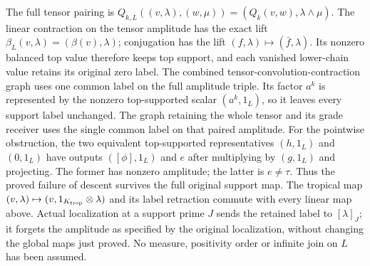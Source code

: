 The full tensor pairing is
$Q_{k,L}((v,\lambda),(w,\mu))
=(Q_k(v,w),\lambda\wedge\mu)$.
The linear contraction on the tensor amplitude
has the exact lift
$\beta_L(v,\lambda)=(\beta(v),\lambda)$;
conjugation has the lift
$(f,\lambda)\mapsto(\bar f,\lambda)$.
Its nonzero balanced top value therefore keeps
top support, and each vanished lower-chain
value retains its original zero label.
The combined tensor-convolution-contraction
graph uses one common label on the full
amplitude triple.
Its factor $a^k$ is represented by the
nonzero top-supported scalar $(a^k,1_L)$,
so it leaves every support label unchanged.
The graph retaining the whole tensor and
its grade receiver uses the single common
label on that paired amplitude.
For the pointwise obstruction, the two
equivalent top-supported representatives
$(h,1_L)$ and $(0,1_L)$ have outputs
$([\phi],1_L)$ and $e$ after multiplying
by $(g,1_L)$ and projecting.
The former has nonzero amplitude; the
latter is $e\ne\tau$.
Thus the proved failure of descent
survives the full original support map.
The tropical map
$(v,\lambda)\mapsto
(v,1_{K_{\rm trop}}\otimes\lambda)$ and its
label retraction commute with every linear
map above. Actual localization at a
support prime $J$ sends the retained label
to $[\lambda]_J$; it forgets the amplitude
as specified by the original localization,
without changing the global maps just
proved. No measure, positivity order or
infinite join on $L$ has been assumed.

